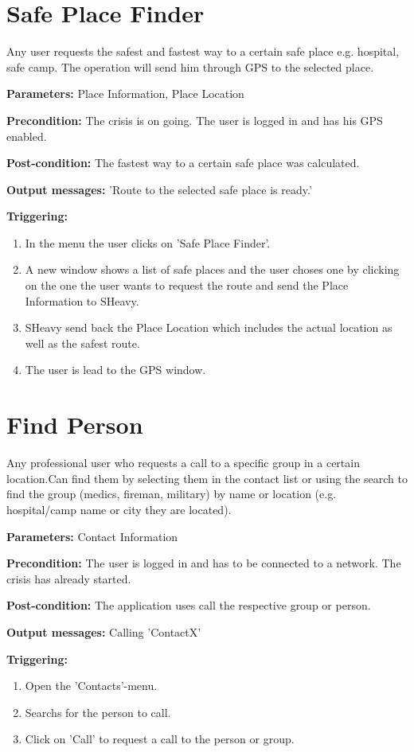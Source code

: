 \section{Safe Place Finder}
\label{operation:SafePlaceFinder}
Any user requests the safest and fastest way to a certain safe place e.g. hospital,
safe camp. The operation will send him through GPS to the selected place.\\
\begin{description}
\item \textbf{Parameters:} Place Information, Place Location
\item \textbf{Precondition:} The crisis is on going. The user is logged in and
has his GPS enabled.
\item \textbf{Post-condition:}  The fastest way to a certain safe place was
calculated.
\item \textbf{Output messages:} 'Route to the selected safe place is ready.'
\item \textbf{Triggering:}
\begin{enumerate}
\item In the menu the user clicks on 'Safe Place Finder'.
\item A new window shows a list of safe places and the user choses one by 
clicking on the one the user wants to request the route and send the Place Information to SHeavy.
\item SHeavy send back the Place Location which includes the actual location as well as the safest route.
\item The user is lead to the GPS window.
\end{enumerate}
\end{description}

\section{Find Person}
\label{operation:FindPerson}
Any professional user who requests a call to a specific group in a certain
location.Can find them by selecting them in the contact list or using the search
to find the group (medics, fireman, military) by name or location (e.g. hospital/camp name or city they are located).\\
\begin{description}
\item \textbf{Parameters:} Contact Information
\item \textbf{Precondition:} The user is logged in and has to be connected to a
network. The crisis has already started.
\item \textbf{Post-condition:} The application uses call the respective group or person.
\item \textbf{Output messages:} Calling 'ContactX'
\item \textbf{Triggering:}
\begin{enumerate}
\item Open the 'Contacts'-menu.
\item Searchs for the person to call.
\item Click on 'Call' to request a call to the person or group.
\end{enumerate}
\end{description} 

